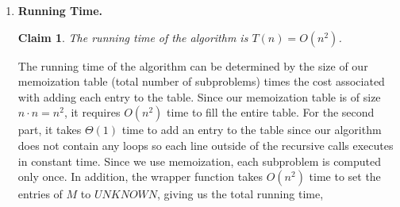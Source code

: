 \documentclass[11pt]{article}
\newtheorem{claim}[theorem]{Claim}
\theoremstyle{nonumberplain}
\begin{document}
\begin{enumerate}
\item \textbf{Running Time.} %
  \begin{claim}
  The running time of the algorithm is $T(n)=O(n^2)$.
  \end{claim}
  The running time of the algorithm can be determined by the size of our memoization table (total number of subproblems) times the cost associated with adding each entry to the table. Since our memoization table is of size $n \cdot n=n^2$, it requires $O(n^2)$ time to fill the entire table. For the second part, it takes $\Theta(1)$ time to add an entry to the table since our algorithm does not contain any loops so each line outside of the recursive calls executes in constant time. Since we use memoization, each subproblem is computed only once. In addition, the wrapper function takes $O(n^2)$ time to set the entries of $M$ to $UNKNOWN$, giving us the total running time,\\

\end{enumerate}
\end{document}
